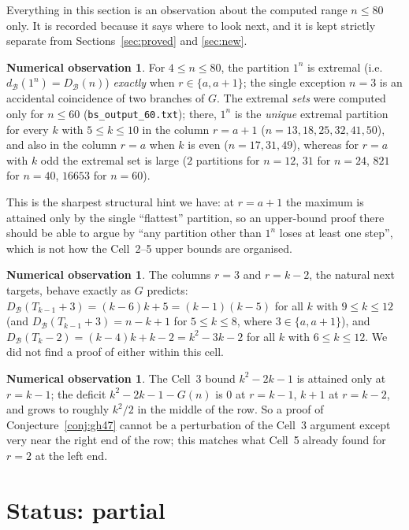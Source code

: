 \documentclass[11pt]{article}
\theoremstyle{definition}
\newtheorem{observation}[theorem]{Numerical observation}
\newcommand{\dB}{d_{\mathcal{B}}}
\newcommand{\DB}{D_{\mathcal{B}}}
\renewcommand{\le}{\leqslant}
\newcommand{\NMAX}{80}
\begin{document}
Everything in this section is an observation about the computed range $n\le\NMAX$ only.  It is recorded because it
says where to look next, and it is kept strictly separate from Sections~\ref{sec:proved} and \ref{sec:new}.

\begin{observation}\label{obs:onen}
For $4\le n\le\NMAX$, the partition $1^n$ is extremal (i.e.\ $\dB(1^n)=\DB(n)$) \emph{exactly} when
$r\in\{a,a+1\}$; the single exception $n=3$ is an accidental coincidence of two branches of $G$.  The extremal
\emph{sets} were computed only for $n\le60$ (\texttt{bs\_output\_60.txt}); there, $1^n$ is the \emph{unique}
extremal partition for every $k$ with $5\le k\le10$ in the column $r=a+1$ ($n=13,18,25,32,41,50$), and also in the
column $r=a$ when $k$ is even ($n=17,31,49$), whereas for $r=a$ with $k$ odd the extremal set is large
($2$ partitions for $n=12$, $31$ for $n=24$, $821$ for $n=40$, $16653$ for $n=60$).
\end{observation}
\noindent This is the sharpest structural hint we have: at $r=a+1$ the maximum is attained only by the single
``flattest'' partition, so an upper-bound proof there should be able to argue by ``any partition other than $1^n$
loses at least one step'', which is not how the Cell~2--5 upper bounds are organised.

\begin{observation}\label{obs:cols}
The columns $r=3$ and $r=k-2$, the natural next targets, behave exactly as $G$ predicts:
$\DB(T_{k-1}+3)=(k-6)k+5=(k-1)(k-5)$ for all $k$ with $9\le k\le12$ (and $\DB(T_{k-1}+3)=n-k+1$ for
$5\le k\le8$, where $3\in\{a,a+1\}$), and $\DB(T_k-2)=(k-4)k+k-2=k^2-3k-2$ for all $k$ with $6\le k\le12$.
We did not find a proof of either within this cell.
\end{observation}

\begin{observation}\label{obs:c3gap}
The Cell~3 bound $k^2-2k-1$ is attained only at $r=k-1$; the deficit $k^2-2k-1-G(n)$ is $0$ at $r=k-1$, $k+1$ at
$r=k-2$, and grows to roughly $k^2/2$ in the middle of the row.  So a proof of Conjecture~\ref{conj:gh47} cannot be
a perturbation of the Cell~3 argument except very near the right end of the row; this matches what Cell~5 already
found for $r=2$ at the left end.
\end{observation}

\section{Status: partial}\label{sec:status}
\end{document}

